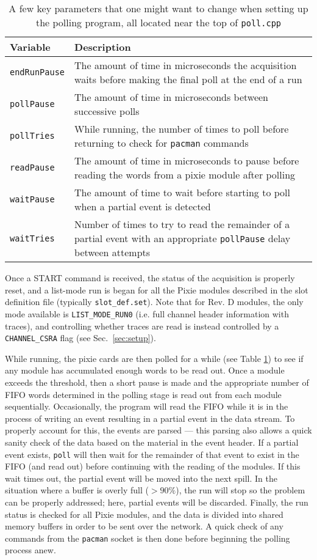 \documentclass[10pt]{article}
\begin{document}
\begin{table}[htp]
\label{tab:poll_parameters}
\caption{A few key parameters that one might want to change when setting up the polling program, all located near the top of \texttt{poll.cpp}}
\begin{tabular}{lp{3.5in}}
\hline
Variable & Description \\
\hline
\texttt{endRunPause} & The amount of time in microseconds the acquisition waits before making the final poll at the end of a run \\ 
\texttt{pollPause} & The amount of time in microseconds between successive polls \\
\texttt{pollTries} & While running, the number of times to poll before returning to check for \texttt{pacman} commands \\
\texttt{readPause} & The amount of time in microseconds to pause before reading the words from a pixie module after polling \\
\texttt{waitPause} & The amount of time to wait before starting to poll when a
partial event is detected \\
\texttt{waitTries} & Number of times to try to read the remainder of a partial
event with an appropriate \texttt{pollPause} delay between attempts \\
\end{tabular}
\end{table}

Once a \textsc{START} command is received, the status of the acquisition is properly reset, and a list-mode run is began for all the Pixie modules described in the slot definition file (typically \texttt{slot\_def.set}). Note that for Rev. D modules, the only mode available is \texttt{LIST\_MODE\_RUN0} (i.e. full channel header information with traces), and controlling whether traces are read is instead controlled by a \texttt{CHANNEL\_CSRA} flag (see Sec.~\ref{sec:setup}).

While running, the pixie cards are then polled for a while (see Table
\ref{tab:poll_parameters}) to see if any module has accumulated enough words
to be read out. Once a module exceeds the threshold, then a short pause is
made and the appropriate number of FIFO words determined in the polling stage
is read out from each module sequentially. Occasionally, the program will read
the FIFO while it is in the process of writing an event resulting in a partial
event in the data stream. To properly account for this, the events are parsed
--- this parsing also allows a quick sanity check of the data based on the
material in the event header. If a partial event exists, \texttt{poll} will
then wait for the remainder of that event to exist in the FIFO (and read out)
before continuing with the reading of the modules. If this wait times out, the
partial event will be moved into the next spill. In the situation where a buffer is overly full ($>90\%$), the run will stop so the problem can be properly addressed; here, partial events will be discarded. Finally, the run status is checked for all Pixie modules, and the data is divided into shared memory buffers in order to be sent over the network. A quick check of any commands from the \texttt{pacman} socket is then done before beginning the polling process anew.
\end{document}
